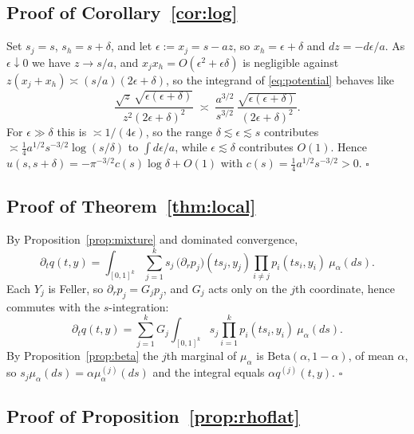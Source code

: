 \documentclass{ws-ijtaf}
\newcommand{\Bet}{\mathrm{Beta}}
\providecommand{\qed}{\hfill\ensuremath{\square}}
\begin{document}
\subsection*{Proof of Corollary~\ref{cor:log}}

Set $s_j=s$, $s_h=s+\delta$, and let $\epsilon := x_j = s-az$, so
$x_h=\epsilon+\delta$ and $dz=-d\epsilon/a$. As $\epsilon\downarrow0$ we have
$z\to s/a$, and $x_jx_h = O(\epsilon^2+\epsilon\delta)$ is negligible against
$z(x_j+x_h)\asymp(s/a)(2\epsilon+\delta)$, so the integrand of
\eqref{eq:potential} behaves like
\begin{equation}
\frac{\sqrt{z}\,\sqrt{\epsilon(\epsilon+\delta)}}{z^{2}(2\epsilon+\delta)^{2}}
\;\asymp\;
\frac{a^{3/2}}{s^{3/2}}\,
\frac{\sqrt{\epsilon(\epsilon+\delta)}}{(2\epsilon+\delta)^{2}} .
\end{equation}
For $\epsilon\gg\delta$ this is $\asymp1/(4\epsilon)$, so the range
$\delta\lesssim\epsilon\lesssim s$ contributes
$\asymp\tfrac14 a^{1/2}s^{-3/2}\log(s/\delta)$ to $\int d\epsilon/a$, while
$\epsilon\lesssim\delta$ contributes $O(1)$. Hence
$u(s,s+\delta)=-\pi^{-3/2}c(s)\log\delta+O(1)$ with
$c(s)=\tfrac14a^{1/2}s^{-3/2}>0$. \qed

\subsection*{Proof of Theorem~\ref{thm:local}}

By Proposition~\ref{prop:mixture} and dominated convergence,
\begin{equation}
\partial_t q(t,y)
= \int_{[0,1]^k} \sum_{j=1}^{k} s_j\,
\big(\partial_r p_j\big)(t s_j, y_j)
\prod_{i\ne j} p_i(t s_i, y_i)\ \mu_\alpha(ds).
\end{equation}
Each $Y_j$ is Feller, so $\partial_r p_j = G_j p_j$, and $G_j$ acts only on the
$j$th coordinate, hence commutes with the $s$-integration:
\begin{equation}
\partial_t q(t,y)
= \sum_{j=1}^{k} G_j \int_{[0,1]^k} s_j
\prod_{i=1}^{k} p_i(t s_i, y_i)\ \mu_\alpha(ds).
\end{equation}
By Proposition~\ref{prop:beta} the $j$th marginal of $\mu_\alpha$ is
$\Bet(\alpha,1-\alpha)$, of mean $\alpha$, so
$s_j\mu_\alpha(ds)=\alpha\mu_\alpha^{(j)}(ds)$ and the integral equals
$\alpha q^{(j)}(t,y)$. \qed

\subsection*{Proof of Proposition~\ref{prop:rhoflat}}
\end{document}
